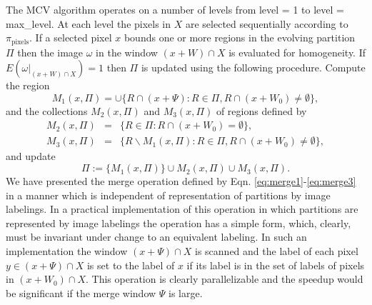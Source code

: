 \documentclass[12pt,twoside]{article}
\begin{document}
The MCV algorithm operates on a number of levels from level = 1 to level = max\_level. At
each level the pixels in $X$ are selected sequentially according to $\pi_{\mbox{pixels}}$. If a selected pixel $x$
bounds one or more regions in the evolving partition $\Pi$ then the image $\omega$ in the window $(x + W) \cap X$ is evaluated for homogeneity. If $E(\omega|_{(x + W) \cap X}) = 1$ then $\Pi$ is updated using the following
procedure. Compute the region
\begin{equation} \label{eq:merge1}
M_1(x,\Pi) = \cup\{R \cap (x +\Psi) : R \in \Pi, R \cap (x +W_0) \neq\emptyset\},
\end{equation}
and the collections $M_2(x,\Pi)$ and $M_3(x,\Pi)$ of regions defined by
\begin{eqnarray}
M_2(x,\Pi) & = & \{R \in \Pi : R \cap (x +W_0) = \emptyset\}, \label{eq:merge2} \\
M_3(x,\Pi) & = & \{R \backslash M_1(x,\Pi) : R \in \Pi, R \cap (x +W_0) \neq\emptyset\}, \label{eq:merge3}
\end{eqnarray}
and update
\begin{equation}
\Pi := \{M_1(x,\Pi)\} \cup M_2(x,\Pi) \cup M_3(x,\Pi).
\end{equation}
We have presented the merge operation defined by Eqn. \ref{eq:merge1}-\ref{eq:merge3} in a manner which is independent
of representation of partitions by image labelings. In a practical implementation of this
operation in which partitions are represented by image labelings the operation has a simple
form, which, clearly, must be invariant under change to an equivalent labeling. In such an implementation
the window $(x +\Psi) \cap X$ is scanned and the label of each pixel $y \in (x + \Psi) \cap X$ is
set to the label of $x$ if its label is in the set of labels of pixels in $(x +W_0) \cap X$. This operation is
clearly parallelizable and the speedup would be significant if the merge window $\Psi$ is large.
\end{document}
